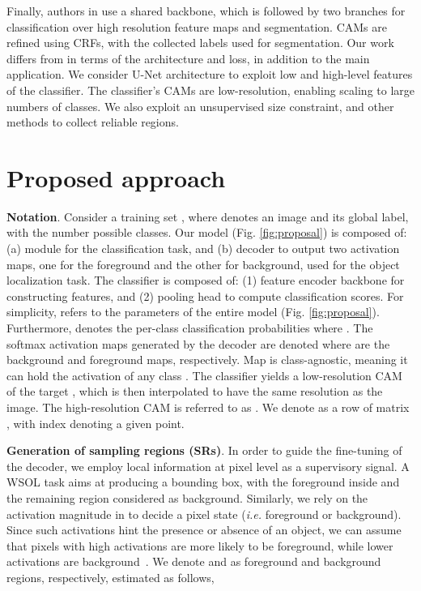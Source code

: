 \documentclass[twocolumn]{article}
\makeatletter
\theoremstyle{definition}
\newcommand*{\ie}{\emph{i.e.}\@\xspace}
\makeatother
\begin{document}
Finally, authors in \cite{ZhangXWSH20RELI} use a shared backbone, which is followed by two branches for classification over high resolution feature maps and segmentation. CAMs are refined using CRFs, with the collected labels used for segmentation. Our work differs from \cite{ZhangXWSH20RELI} in terms of the architecture and loss, in addition to the main application. We consider U-Net architecture to exploit low and high-level features of the classifier. The classifier's CAMs are low-resolution, enabling scaling to large numbers of classes. We also exploit an unsupervised size constraint, and other methods to collect reliable regions.



\section{Proposed approach}
\label{sec:proposal}

\noindent \textbf{Notation}. Consider a training set , where  denotes an image and  its global label, with  the number possible classes. Our model (Fig. \ref{fig:proposal}) is composed of: (a) module  for the classification task, and (b) decoder  to output two activation maps, one for the foreground and the other for background, used for the object localization task. The classifier is composed of: (1) feature encoder backbone for constructing features, and (2) pooling head to compute classification scores. For simplicity,  refers to the parameters of the entire model (Fig. \ref{fig:proposal}).  Furthermore,  denotes the per-class classification probabilities where .
The softmax activation maps generated by the decoder are denoted  where  are the background and foreground maps, respectively. Map  is class-agnostic, meaning it can hold the activation of any class .
The classifier yields a low-resolution CAM of the target , which is then interpolated to have the same resolution as the image. The high-resolution CAM is referred to as . We denote  as a row of matrix , with index  denoting a given point.

\noindent \textbf{Generation of sampling regions (SRs)}. In order to guide the fine-tuning of the decoder, we employ local information at pixel level as a supervisory signal. A WSOL task aims at producing a bounding box, with the foreground inside and the remaining region considered as background. Similarly, we rely on the activation magnitude in  to decide a pixel state (\ie foreground or background). Since such activations hint the presence or absence of an object, we can  assume that pixels with high activations are more likely to be foreground, while lower activations are background~\cite{durand2017wildcat}. We denote  and  as foreground and background regions, respectively, estimated as follows,
\end{document}
